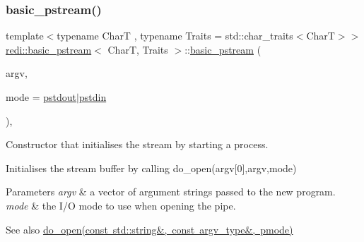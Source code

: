 \subsubsection{\texorpdfstring{basic\+\_\+pstream()}{basic\_pstream()}\hspace{0.1cm}{\footnotesize\ttfamily [3/3]}}
{\footnotesize\ttfamily template$<$typename CharT , typename Traits  = std\+::char\+\_\+traits$<$\+Char\+T$>$$>$ \\
\mbox{\hyperlink{classredi_1_1basic__pstream}{redi\+::basic\+\_\+pstream}}$<$ CharT, Traits $>$\+::\mbox{\hyperlink{classredi_1_1basic__pstream}{basic\+\_\+pstream}} (\begin{DoxyParamCaption}\item[{const \mbox{\hyperlink{structredi_1_1pstreams_af902b894b095c1875e96c10129489467}{argv\+\_\+type}} \&}]{argv,  }\item[{\mbox{\hyperlink{structredi_1_1pstreams_a1eae4aad88812af03a0fbb3ec13c50b7}{pmode}}}]{mode = {\ttfamily \mbox{\hyperlink{structredi_1_1pstreams_ad3c6d53a98de4566478b1c40c101a42b}{pstdout}}$\vert$\mbox{\hyperlink{structredi_1_1pstreams_a7a976ce992db857f86a0cc3352e42d3a}{pstdin}}} }\end{DoxyParamCaption})\hspace{0.3cm}{\ttfamily [inline]}, {\ttfamily [explicit]}}



Constructor that initialises the stream by starting a process. 

Initialises the stream buffer by calling {\ttfamily do\+\_\+open(argv\mbox{[}0\mbox{]},argv,mode)} 


\begin{DoxyParams}{Parameters}
{\em argv} & a vector of argument strings passed to the new program. \\
\hline
{\em mode} & the I/O mode to use when opening the pipe. \\
\hline
\end{DoxyParams}
\begin{DoxySeeAlso}{See also}
\mbox{\hyperlink{classredi_1_1pstream__common_a352b77fa600f7ebe0d8f1582be05ae4d}{do\+\_\+open(const std\+::string\&, const argv\+\_\+type\&, pmode)}} 
\end{DoxySeeAlso}
\mbox{\label{classredi_1_1basic__pstream_a331fbc7e238df3a47736499c6c48380c}} 
